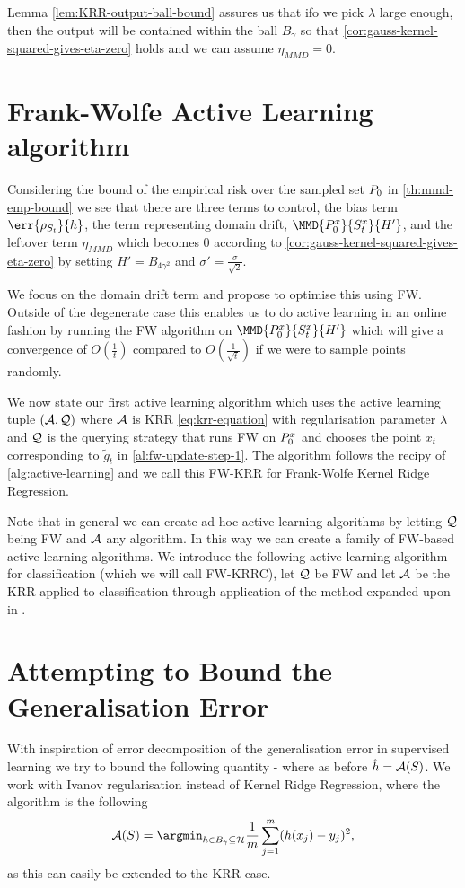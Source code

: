 Lemma \ref{lem:KRR-output-ball-bound} assures us that ifo we pick \(\lambda\)
large enough, then the output will be contained within the ball \(B_{\gamma}\)
so that \ref{cor:gauss-kernel-squared-gives-eta-zero} holds and we can assume
\(\eta_{MMD} = 0\).


\section{Frank-Wolfe Active Learning algorithm}
Considering the bound of the empirical risk over the sampled set
\(P_{0}\) in \ref{th:mmd-emp-bound} we see that there are three terms to
control, the bias term \(\err{\rho_{\trainset_{t}}}{h}\), the term representing
domain drift, \(\MMD{\poolsetx_{0}}{\trainsetx_{t}}{H'}\), and the leftover term
\(\eta_{MMD}\) which becomes \(0\) according to
\ref{cor:gauss-kernel-squared-gives-eta-zero} by setting \(H' = B_{4\gamma^{2}}\)
and \(\sigma' = \frac{\sigma}{\sqrt{2}}\). 

We focus on the domain drift term and propose to optimise this using FW. Outside
of the degenerate case this enables us to do active learning in an online
fashion by running the FW algorithm on
\(\MMD{\poolsetx_{0}}{\trainsetx_{t}}{H'}\) which will give a convergence of
\(O(\frac{1}{t})\) compared to \(O(\frac{1}{\sqrt{t}})\) if we were to sample
points randomly.

We now state our first active learning algorithm which uses the active learning
tuple \((\mathcal{A}, \mathcal{Q})\) where \(\mathcal{A}\) is KRR \ref{eq:krr-equation} with regularisation
parameter \(\lambda\) and \(\mathcal{Q}\) is the querying strategy that runs FW on
\(P^x_{0}\) and chooses the point \(x_{t}\) corresponding to
\(\tilde{g}_{t}\) in \ref{al:fw-update-step-1}. The algorithm follows the recipy of
\ref{alg:active-learning} and we call this FW-KRR for Frank-Wolfe Kernel Ridge
Regression.

Note that in general we can create ad-hoc active learning algorithms by letting
\(\mathcal{Q}\) being FW and \(\mathcal{A}\) any algorithm. In this way we can create a
family of FW-based active learning algorithms. We introduce the following active
learning algorithm for classification (which we will call FW-KRRC), let
\(\mathcal{Q}\) be FW and let \(\mathcal{A}\) be the KRR applied to classification
through application of the method expanded upon in \cite{ciliberto16}.

\section{Attempting to Bound the Generalisation Error}
With inspiration of error decomposition of the generalisation error in
supervised learning we try to bound the following quantity
 - 
where as before \(\hat{h} = \mathcal{A}(S)\). We work with
Ivanov regularisation instead of Kernel Ridge Regression, where the algorithm is
the following
\begin{equation}
  \label{eq:eq:ivanov-kr}
  \algo(\trainset) = \argmin_{h \in B_{\gamma} \subseteq \rkhs{H}} \frac{1}{m}\sum_{j=1}^{m}(h(x_{j}) - y_{j})^{2},
\end{equation}
as this can easily be extended to the KRR case.

